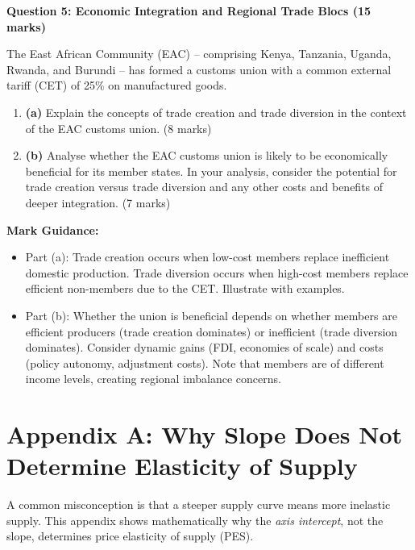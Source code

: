 \documentclass[11pt, a4paper, twoside]{book}
\begin{document}
\begin{exampractice}

\textbf{Question 5: Economic Integration and Regional Trade Blocs (15 marks)}

The East African Community (EAC) -- comprising Kenya, Tanzania, Uganda, Rwanda, and Burundi -- has formed a customs union with a common external tariff (CET) of 25\% on manufactured goods.

\begin{enumerate}
  \item \textbf{(a)} Explain the concepts of trade creation and trade diversion in the context of the EAC customs union. (8 marks)

  \item \textbf{(b)} Analyse whether the EAC customs union is likely to be economically beneficial for its member states. In your analysis, consider the potential for trade creation versus trade diversion and any other costs and benefits of deeper integration. (7 marks)
\end{enumerate}

\textbf{Mark Guidance:}
\begin{itemize}
  \item Part (a): Trade creation occurs when low-cost members replace inefficient domestic production. Trade diversion occurs when high-cost members replace efficient non-members due to the CET. Illustrate with examples.
  \item Part (b): Whether the union is beneficial depends on whether members are efficient producers (trade creation dominates) or inefficient (trade diversion dominates). Consider dynamic gains (FDI, economies of scale) and costs (policy autonomy, adjustment costs). Note that members are of different income levels, creating regional imbalance concerns.
\end{itemize}

\end{exampractice}

\clearpage
\pagestyle{fancy}
\chapter*{Appendix A: Why Slope Does Not Determine Elasticity of Supply}

A common misconception is that a steeper supply curve means more inelastic supply. This appendix shows mathematically why the \emph{axis intercept}, not the slope, determines price elasticity of supply (PES).
\end{document}
